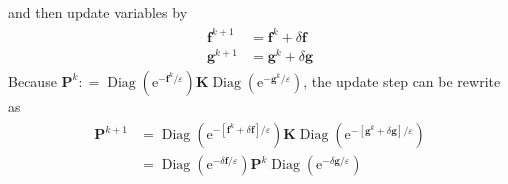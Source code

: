 \documentclass{article}
\begin{document}
\begin{large}
\begin{align}
\end{align}
and then update variables by
\begin{align}
\begin{aligned}  \mathbf {f} ^ { k + 1 } & =  \mathbf {f} ^ { k } + \delta  \mathbf {f} \\  \mathbf {g} ^ { k + 1 } & =  \mathbf {g} ^ { k } + \delta  \mathbf {g} \end{aligned}
\end{align}
Because $ \mathbf {P} ^ { k } : = \operatorname { Diag } \left( \mathrm { e } ^ { -  \mathbf {f} ^ { k } / \varepsilon } \right) \mathbf { K} \operatorname { Diag } \left( \mathrm { e } ^ { -  \mathbf {g} ^ { k } / \varepsilon } \right)$, the update step can be rewrite as
\begin{align}
\begin{aligned}  \mathbf {P} ^ { k + 1 } & = \operatorname { Diag } \left( \mathrm { e } ^ { - \left[  \mathbf {f} ^ { k } + \delta  \mathbf {f} \right] / \varepsilon } \right)  \mathbf {K} \operatorname { Diag } \left( \mathrm { e } ^ { - \left[  \mathbf {g} ^ { k } + \delta  \mathbf {g} \right] / \varepsilon } \right) \\ & = \operatorname { Diag } \left( \mathrm { e } ^ { - \delta  \mathbf {f} / \varepsilon } \right)  \mathbf {P} ^ { k } \operatorname { Diag } \left( \mathrm { e } ^ { - \delta  \mathbf {g} / \varepsilon } \right) \end{aligned}
\end{align}



\end{large}
\end{document}
